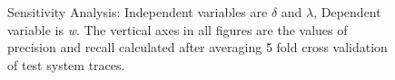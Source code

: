 \begin{figure}%
    \centering
    \qquad
    \caption{Sensitivity Analysis: Independent variables are $\delta$ and $\lambda$, Dependent variable is \textit{w}. The vertical axes in all figures are the values of precision and recall calculated after averaging 5 fold cross validation of test system traces.}%
    \label{fig:sensitivityAnalysis}%
\end{figure}

